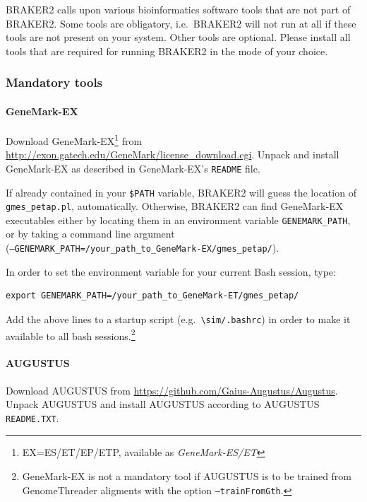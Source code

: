 \documentclass[]{article}
\let\oldparagraph\paragraph
\renewcommand{\paragraph}[1]{\oldparagraph{#1}\mbox{}}
\begin{document}
BRAKER2 calls upon various bioinformatics software tools that are not
part of BRAKER2. Some tools are obligatory, i.e.~BRAKER2 will not run at
all if these tools are not present on your system. Other tools are
optional. Please install all tools that are required for running BRAKER2
in the mode of your choice.

\hypertarget{mandatory-tools}{\subsubsection{Mandatory
tools}\label{mandatory-tools}}

\paragraph{GeneMark-EX}\label{genemark-ex}

Download GeneMark-EX\footnote{EX=ES/ET/EP/ETP, available as
  \emph{GeneMark-ES/ET}} from
\url{http://exon.gatech.edu/GeneMark/license_download.cgi}. Unpack and
install GeneMark-EX as described in GeneMark-EX's \texttt{README} file.

If already contained in your \texttt{\$PATH} variable, BRAKER2 will
guess the location of \texttt{gmes\_petap.pl}, automatically. Otherwise,
BRAKER2 can find GeneMark-EX executables either by locating them in an
environment variable \texttt{GENEMARK\_PATH}, or by taking a command
line argument\\
(\texttt{–GENEMARK\_PATH=/your\_path\_to\_GeneMark-EX/gmes\_petap/}).

In order to set the environment variable for your current Bash session,
type:

\begin{verbatim}
export GENEMARK_PATH=/your_path_to_GeneMark-ET/gmes_petap/
\end{verbatim}

Add the above lines to a startup script
(e.g.~\texttt{\textbackslash{}sim/.bashrc}) in order to make it
available to all bash sessions.\footnote{GeneMark-EX is not a mandatory
  tool if AUGUSTUS is to be trained from GenomeThreader aligments with
  the option \texttt{–trainFromGth}.}

\paragraph{AUGUSTUS}\label{augustus}

Download AUGUSTUS from \url{https://github.com/Gaius-Augustus/Augustus}.
Unpack AUGUSTUS and install AUGUSTUS according to AUGUSTUS
\texttt{README.TXT}.
\end{document}
